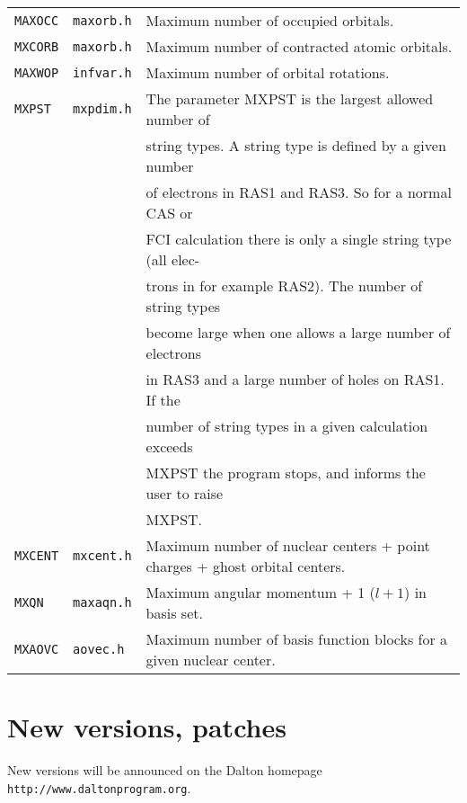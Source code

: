 \bigskip

\begin{tabular}{lll}
\verb|MAXOCC| & \verb|maxorb.h| & Maximum number of occupied
orbitals.\index{occupied orbitals!max limit}\index{limits}\\
\verb|MXCORB| & \verb|maxorb.h| & Maximum number of contracted atomic
orbitals.\index{orbitals!max limit}\index{limits!orbitals}\\
\verb|MAXWOP| & \verb|infvar.h| & Maximum number of orbital
rotations.\index{orbital rotations!max limit}\index{limits}\\
\verb|MXPST| & \verb|mxpdim.h| & The parameter MXPST is the largest
allowed number\index{limits!CI string types} of \\
&& string types.  A string type is defined by a given number \\
&& of electrons in RAS1 and RAS3. So for a normal CAS or \\
&& FCI calculation there is only a single string type (all elec-\\
&&trons in for example RAS2). The number of string types \\
&& become large when one allows a large number of electrons \\
&& in  RAS3  and a large number of holes on RAS1. If the \\
&& number of  string types in a given calculation exceeds \\
&& MXPST the program stops, and informs the user to raise\\
&& MXPST.\\
\verb|MXCENT| & \verb|mxcent.h| & Maximum number of nuclear centers +
point charges + ghost orbital centers.\index{nuclei!change max number}\index{limits!number of nuclei}\\
\verb|MXQN| & \verb|maxaqn.h| & Maximum angular momentum + 1 ($l+1$) in basis
set.\index{limits!max l-quantum number in basis functions}\\
\verb|MXAOVC| & \verb|aovec.h| & Maximum number of basis function blocks for
a given nuclear center.\index{limits!number of basis function blocks}
\end{tabular}

\section{New versions, patches}

New versions will be announced on the Dalton
homepage \verb|http://www.daltonprogram.org|.

